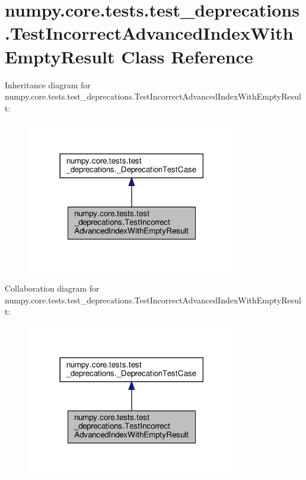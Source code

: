 \hypertarget{classnumpy_1_1core_1_1tests_1_1test__deprecations_1_1TestIncorrectAdvancedIndexWithEmptyResult}{}\section{numpy.\+core.\+tests.\+test\+\_\+deprecations.\+Test\+Incorrect\+Advanced\+Index\+With\+Empty\+Result Class Reference}
\label{classnumpy_1_1core_1_1tests_1_1test__deprecations_1_1TestIncorrectAdvancedIndexWithEmptyResult}


Inheritance diagram for numpy.\+core.\+tests.\+test\+\_\+deprecations.\+Test\+Incorrect\+Advanced\+Index\+With\+Empty\+Result\+:
\nopagebreak
\begin{figure}[H]
\begin{center}
\leavevmode
\includegraphics[width=261pt]{classnumpy_1_1core_1_1tests_1_1test__deprecations_1_1TestIncorrectAdvancedIndexWithEmptyResult__inherit__graph}
\end{center}
\end{figure}


Collaboration diagram for numpy.\+core.\+tests.\+test\+\_\+deprecations.\+Test\+Incorrect\+Advanced\+Index\+With\+Empty\+Result\+:
\nopagebreak
\begin{figure}[H]
\begin{center}
\leavevmode
\includegraphics[width=261pt]{classnumpy_1_1core_1_1tests_1_1test__deprecations_1_1TestIncorrectAdvancedIndexWithEmptyResult__coll__graph}
\end{center}
\end{figure}
